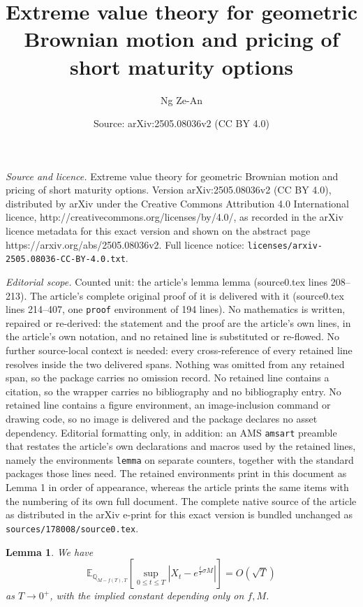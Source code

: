 \documentclass[10pt,a4paper]{amsart}
\title{Extreme value theory for geometric Brownian motion and pricing of short maturity options}
\author{Ng Ze-An}
\date{Source: arXiv:2505.08036v2 (CC BY 4.0)}
\newtheorem{lemma}{Lemma}
\begin{document}
\maketitle

\noindent\emph{Source and licence.} Extreme value theory for geometric Brownian motion and pricing of short maturity options. Version arXiv:2505.08036v2 (CC BY 4.0), distributed by arXiv under the Creative Commons Attribution 4.0 International licence, http://creativecommons.org/licenses/by/4.0/, as recorded in the arXiv licence metadata for this exact version and shown on the abstract page https://arxiv.org/abs/2505.08036v2. Full licence notice: \texttt{licenses/arxiv-2505.08036-CC-BY-4.0.txt}.\par\smallskip

\noindent\textit{Editorial scope.} Counted unit: the article's lemma lemma (source0.tex lines 208--213). The article's complete original proof of it is delivered with it (source0.tex lines 214--407, one \texttt{proof} environment of 194 lines). No mathematics is written, repaired or re-derived: the statement and the proof are the article's own lines, in the article's own notation, and no retained line is substituted or re-flowed.  No further source-local context is needed: every cross-reference of every retained line resolves inside the two delivered spans.  Nothing was omitted from any retained span, so the package carries no omission record.  No retained line contains a citation, so the wrapper carries no bibliography and no bibliography entry.  No retained line contains a figure environment, an image-inclusion command or drawing code, so no image is delivered and the package declares no asset dependency.  Editorial formatting only, in addition: an AMS \texttt{amsart} preamble that restates the article's own declarations and macros used by the retained lines, namely the environments \texttt{lemma} on separate counters, together with the standard packages those lines need.  The retained environments print in this document as Lemma 1 in order of appearance, whereas the article prints the same items with the numbering of its own full document.  The complete native source of the article as distributed in the arXiv e-print for this exact version is bundled unchanged as \texttt{sources/178008/source0.tex}.
\begin{lemma}We have
$$
\mathbb{E}_{\mathbb{Q}_{M-f(T), T}}\left[\sup _{0 \leq t \leq T}\left|X_{t}-e^{\frac{t}{T} \sigma M}\right|\right]=O(\sqrt{T})
$$
as $T \rightarrow 0^{+}$, with the implied constant depending only on $f, M$.
\end{lemma}
\end{document}
